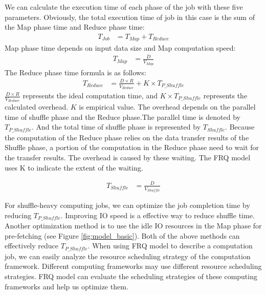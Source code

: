 {We can calculate the execution time of each phase of the job with these five parameters. Obviously, the total execution time of job in this case is the sum of the Map phase time and Reduce phase time:
\begin{equation}
\label{equation_Tjob}
\begin{aligned}
    T_{Job} &= T_{Map} + T_{Reduce}
\end{aligned}
\end{equation}
Map phase time depends on input data size and Map computation speed:
\begin{equation}
\label{equation_Tmap}
\begin{aligned}
    T_{Map} &= {{\frac{D}{V_{Map}}}}
\end{aligned}
\end{equation}
The Reduce phase time formula is as follows:
\begin{equation}
\label{equation_Treduce}
\begin{aligned}
    T_{Reduce} &= \frac{D \times R}{V_{Reduce}} + K \times T_{P\_Shuffle}
\end{aligned}
\end{equation}
\(\frac{D \times R}{V_{Reduce}}\) represents the ideal computation time, and \(K \times T_{P\_Shuffle}\) represents the calculated overhead. \(K\) is empirical value. The overhead depends on the parallel time of shuffle phase and the Reduce phase.The parallel time is denoted by \(T_{P\_Shuffle}\). And the total time of shuffle phase is represented by \(T_{Shuffle}\). Because the computation of the Reduce phase relies on the data transfer results of the Shuffle phase, a portion of the computation in the Reduce phase need to wait for the transfer results. The overhead is caused by these waiting. The FRQ model uses K to indicate the extent of the waiting.

\begin{equation}
\label{equation_Tshuffle}
\begin{aligned}
    T_{Shuffle} &= {{\frac{D}{V_{Shuffle}}}}
\end{aligned}
\end{equation}

For shuffle-heavy computing jobs, we can optimize the job completion time by reducing \(T_{P\_Shuffle}\). Improving IO speed is a effective way to reduce shuffle time. Another optimization method is to use the idle IO resources in the Map phase for pre-fetching (see Figure \ref{fig:model_basic}). Both of the above methods can effectively reduce \(T_{P\_Shuffle}\). When using FRQ model to describe a computation job, we can easily analyze the resource scheduling strategy of the computation framework. Different computing frameworks may use different resource scheduling strategies. FRQ model can evaluate the scheduling strategies of these computing frameworks and help us optimize them.

}
